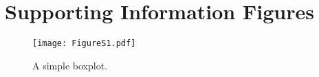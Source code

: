 \documentclass[a4paper]{article}\usepackage[]{graphicx}\usepackage[]{color}
\begin{document}
\clearpage
\section{Supporting Information Figures}

\renewcommand\thefigure{S\arabic{figure}}    
\setcounter{figure}{0}   



\begin{figure}[h!]
    \centering
    \texttt{[image: FigureS1.pdf]}
    \caption{A simple boxplot.}
    \label{fig:figureSI1}
\end{figure}






\clearpage

\end{document}
